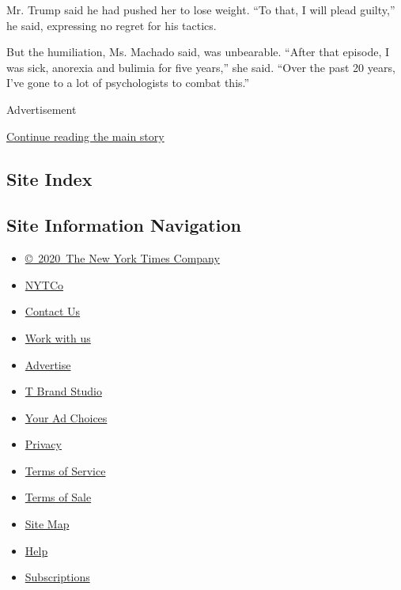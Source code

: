 Mr. Trump said he had pushed her to lose weight. ``To that, I will plead
guilty,'' he said, expressing no regret for his tactics.

But the humiliation, Ms. Machado said, was unbearable. ``After that
episode, I was sick, anorexia and bulimia for five years,'' she said.
``Over the past 20 years, I've gone to a lot of psychologists to combat
this.''

Advertisement

\protect\hyperlink{after-bottom}{Continue reading the main story}

\hypertarget{site-index}{%
\subsection{Site Index}\label{site-index}}

\hypertarget{site-information-navigation}{%
\subsection{Site Information
Navigation}\label{site-information-navigation}}

\begin{itemize}
\tightlist
\item
  \href{https://help.nytimes.com/hc/en-us/articles/115014792127-Copyright-notice}{©~2020~The
  New York Times Company}
\end{itemize}

\begin{itemize}
\tightlist
\item
  \href{https://www.nytco.com/}{NYTCo}
\item
  \href{https://help.nytimes.com/hc/en-us/articles/115015385887-Contact-Us}{Contact
  Us}
\item
  \href{https://www.nytco.com/careers/}{Work with us}
\item
  \href{https://nytmediakit.com/}{Advertise}
\item
  \href{http://www.tbrandstudio.com/}{T Brand Studio}
\item
  \href{https://www.nytimes.com/privacy/cookie-policy\#how-do-i-manage-trackers}{Your
  Ad Choices}
\item
  \href{https://www.nytimes.com/privacy}{Privacy}
\item
  \href{https://help.nytimes.com/hc/en-us/articles/115014893428-Terms-of-service}{Terms
  of Service}
\item
  \href{https://help.nytimes.com/hc/en-us/articles/115014893968-Terms-of-sale}{Terms
  of Sale}
\item
  \href{https://spiderbites.nytimes.com}{Site Map}
\item
  \href{https://help.nytimes.com/hc/en-us}{Help}
\item
  \href{https://www.nytimes.com/subscription?campaignId=37WXW}{Subscriptions}
\end{itemize}
